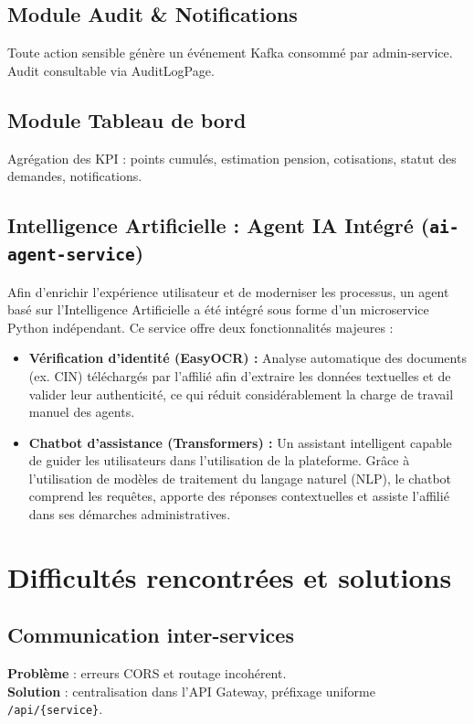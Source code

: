 \documentclass[12pt,a4paper,oneside]{report}
\begin{document}
\subsection{Module Audit \& Notifications}
Toute action sensible génère un événement Kafka consommé par admin-service. Audit consultable via AuditLogPage.

\subsection{Module Tableau de bord}
Agrégation des KPI : points cumulés, estimation pension, cotisations, statut des demandes, notifications.

\subsection{Intelligence Artificielle : Agent IA Intégré (\texttt{ai-agent-service})}
Afin d'enrichir l'expérience utilisateur et de moderniser les processus, un agent basé sur l'Intelligence Artificielle a été intégré sous forme d'un microservice Python indépendant. Ce service offre deux fonctionnalités majeures :
\begin{itemize}
    \item \textbf{Vérification d'identité (EasyOCR) :} Analyse automatique des documents (ex. CIN) téléchargés par l'affilié afin d'extraire les données textuelles et de valider leur authenticité, ce qui réduit considérablement la charge de travail manuel des agents.
    \item \textbf{Chatbot d'assistance (Transformers) :} Un assistant intelligent capable de guider les utilisateurs dans l'utilisation de la plateforme. Grâce à l'utilisation de modèles de traitement du langage naturel (NLP), le chatbot comprend les requêtes, apporte des réponses contextuelles et assiste l'affilié dans ses démarches administratives.
\end{itemize}

\section{Difficultés rencontrées et solutions}

\subsection{Communication inter-services}
\textbf{Problème} : erreurs CORS et routage incohérent. \\
\textbf{Solution} : centralisation dans l'API Gateway, préfixage uniforme \texttt{/api/\{service\}}.
\end{document}
